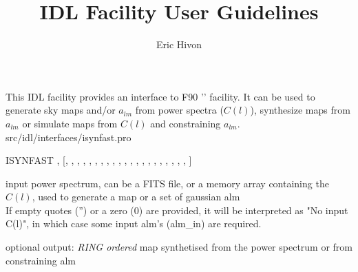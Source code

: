
\sloppy

\title{\healpix IDL Facility User Guidelines}
 \section[isynfast]{ }
\label{idl:isynfast}
\author{Eric Hivon}

\begin{facility}
{This IDL facility provides an interface to F90 '' facility. It can be
used to generate sky maps and/or $a_{lm}$ from power spectra ($C(l)$), synthesize maps from
$a_{lm}$ or simulate maps from $C(l)$ and constraining $a_{lm}$.}
{src/idl/interfaces/isynfast.pro}
\end{facility}

\begin{IDLformat}
{ISYNFAST%
, %
 [, %
,
,  %
, %
, %
, %
, %
, %
, %
,
, %
, %
, %
, %
, %
, %
,
, %
, %
, %
, %
]}
\end{IDLformat}

\begin{qualifiers}
  \begin{qulist}{} %
   \item[cl\_in\mytarget{idl:isynfast:cl_in}%
] input power spectrum, can be a FITS file, or a memory array containing the
        $C(l)$, used to generate a map or a set of gaussian alm \\
   If empty quotes ('') or a zero (0) are provided, it will be interpreted as "No input C(l)", in
   which case some input alm's (alm\_in) are required.
    \item[map\_out\mytarget{idl:isynfast:map_out}%
] optional output: {\em RING ordered} map synthetised from the power spectrum or from constraining alm
  \end{qulist}
\end{qualifiers}

